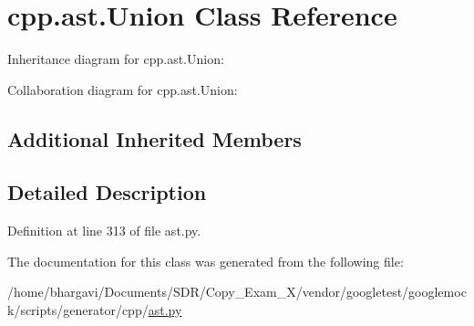 \hypertarget{classcpp_1_1ast_1_1_union}{}\section{cpp.\+ast.\+Union Class Reference}
\label{classcpp_1_1ast_1_1_union}


Inheritance diagram for cpp.\+ast.\+Union\+:


Collaboration diagram for cpp.\+ast.\+Union\+:
\subsection*{Additional Inherited Members}


\subsection{Detailed Description}


Definition at line 313 of file ast.\+py.



The documentation for this class was generated from the following file\+:\begin{DoxyCompactItemize}
\item 
/home/bhargavi/\+Documents/\+S\+D\+R/\+Copy\+\_\+\+Exam\+\_\+X/vendor/googletest/googlemock/scripts/generator/cpp/\hyperlink{ast_8py}{ast.\+py}\end{DoxyCompactItemize}
